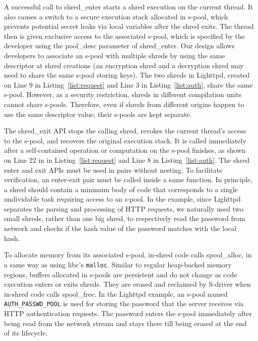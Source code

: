 A successful call to {\btt shred\_enter} starts a shred execution on the current thread. 
It also causes a switch to a secure execution stack allocated in s-pool, which prevents potential secret leaks via local variables after the shred exits. 
The thread then is given exclusive access to the associated s-pool, which is specified by the developer using the {\itt pool\_desc} parameter of {\btt shred\_enter}. 
Our design allows developers to associate an s-pool with multiple shreds by using the same descriptor at shred creations (\eg an encryption shred and a decryption shred may need to share the same s-pool storing keys). 
The two shreds in Lighttpd, created on Line 9 in Listing~\ref{list:request} and Line 3 in Listing~\ref{list:auth}, share the same s-pool. 
However, as a security restriction, shreds in different compilation units cannot share s-pools. Therefore, even if shreds from different origins happen to use the same descriptor value, their s-pools are kept separate. 

The {\btt shred\_exit} API stops the calling shred, revokes the current thread's access to the s-pool, and recovers the original execution stack. It is called immediately after a self-contained operation or computation on the s-pool finishes, as shown on Line 22 in in Listing~\ref{list:request} and Line 8 in Listing~\ref{list:auth}. 
The shred enter and exit APIs must be used in pairs without nesting. 
To facilitate verification, an enter-exit pair must be called inside a same function.
In principle, a shred should contain a minimum body of code that corresponds to a single undividable task requiring access to an s-pool. 
In the example, since Lighttpd separates the parsing and processing of HTTP requests, we naturally used two small shreds, rather than one big shred, to respectively read the password from network and checks if the hash value of the password matches with the local hash. 

To allocate memory from its associated s-pool, in-shred code calls {\btt spool\_alloc}, in a same way as using libc's {\tt malloc}. 
Similar to regular heap-backed memory regions, buffers allocated in s-pools are persistent and do not change as code execution enters or exits shreds. They are erased and reclaimed by S-driver when in-shred code calls {\btt spool\_free}. 
In the Lighttpd example, an s-pool named  {\tt  AUTH\_PASSWD\_POOL} is used for storing the password that the server receives via HTTP authentication requests. 
The password enters the s-pool immediately after being read from the network stream and stays there till being erased at the end of its lifecycle. 


